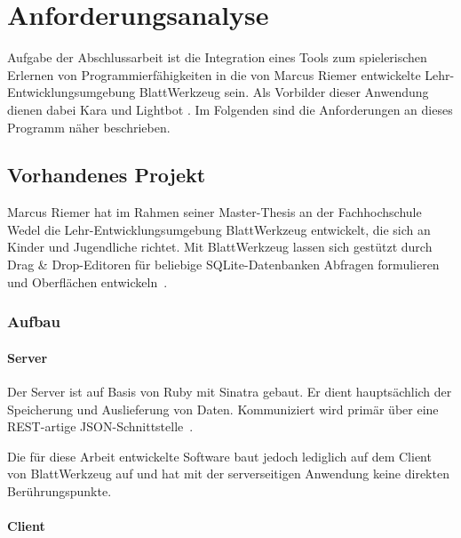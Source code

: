 \chapter{Anforderungsanalyse}
\label{sec:requirements}

Aufgabe der Abschlussarbeit ist die Integration eines Tools zum spielerischen Erlernen von Programmierfähigkeiten in die von Marcus Riemer entwickelte Lehr-Entwicklungsumgebung BlattWerkzeug  sein. Als Vorbilder dieser Anwendung dienen dabei Kara  und Lightbot . Im Folgenden sind die Anforderungen an dieses Programm näher beschrieben.

\section{Vorhandenes Projekt}
\label{sec:requirements:existing}

Marcus Riemer hat im Rahmen seiner Master-Thesis an der Fachhochschule Wedel die Lehr-Entwicklungsumgebung BlattWerkzeug entwickelt, die sich an Kinder und Jugendliche richtet. Mit BlattWerkzeug lassen sich gestützt durch Drag \& Drop-Editoren für beliebige SQLite-Datenbanken Abfragen formulieren und Oberflächen entwickeln~\cite[2]{riemer2016}.

\subsection{Aufbau}

\subsubsection{Server}

Der Server ist auf Basis von Ruby mit Sinatra gebaut. Er dient hauptsächlich der Speicherung und Auslieferung von Daten. Kommuniziert wird primär über eine REST-artige JSON-Schnittstelle~\cite[94]{riemer2016}.

Die für diese Arbeit entwickelte Software baut jedoch lediglich auf dem Client von BlattWerkzeug auf und hat mit der serverseitigen Anwendung keine direkten Berührungspunkte.

\subsubsection{Client}


